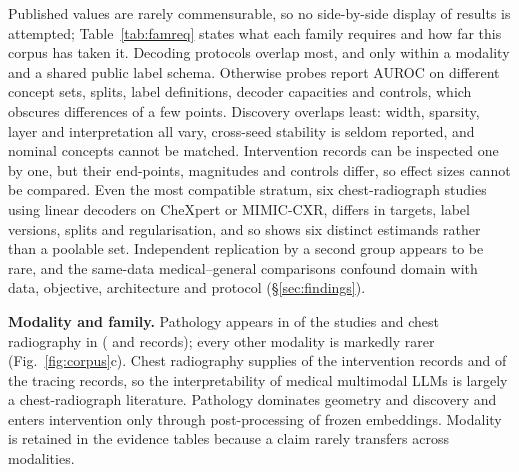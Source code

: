 Published values are rarely commensurable, so no side-by-side display of results is attempted;
Table~\ref{tab:famreq} states what each family requires and how far this corpus has taken it. Decoding
protocols overlap most, and only within a modality and a shared public label schema. Otherwise probes
report AUROC on different concept sets, splits, label definitions, decoder capacities and controls, which
obscures differences of a few points. Discovery overlaps least: width, sparsity, layer and
interpretation all vary, cross-seed stability is seldom reported, and nominal concepts cannot be
matched. Intervention records can be inspected one by one, but their end-points, magnitudes and controls
differ, so effect sizes cannot be compared. Even the most compatible stratum, six chest-radiograph
studies using linear decoders on CheXpert or MIMIC-CXR, differs in targets, label versions, splits and
regularisation, and so shows six distinct estimands rather than a poolable set. Independent replication
by a second group appears to be rare, and the same-data medical--general comparisons confound domain with
data, objective, architecture and protocol (\S\ref{sec:findings}).

\textbf{Modality and family.} Pathology appears in \Npathstud{} of the \Ncore{} studies and chest
radiography in \Ncxrstud{} (\Npathrec{} and \Ncxrrec{} records); every other modality is markedly rarer
(Fig.~\ref{fig:corpus}c). Chest radiography supplies \Nintcxr{} of the \Nintrec{} intervention records
and \Ntracecxr{} of the \Ntracerec{} tracing records, so the interpretability of medical multimodal
LLMs is largely a chest-radiograph literature. Pathology dominates geometry and discovery and enters
intervention only through post-processing of frozen embeddings. Modality is retained in the evidence
tables because a claim rarely transfers across modalities.

